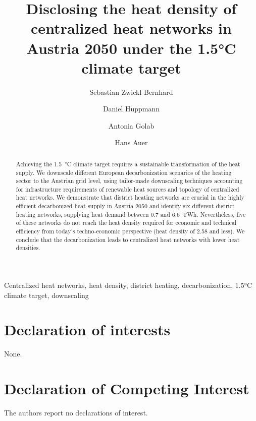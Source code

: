\documentclass[review]{elsarticle}
\begin{document}
\begin{frontmatter}

\title{Disclosing the heat density of centralized heat networks in Austria 2050 under the 1.5°C climate target}
\author[1,2]{Sebastian Zwickl-Bernhard}
\author[2]{Daniel Huppmann}
\author[1]{Antonia Golab}
\author[1]{Hans Auer}
\address[1]{Energy Economics Group (EEG), Technische Universität Wien, Gusshausstrasse 25-29/E370-3, 1040 Wien, Austria}
\address[2]{Energy, Climate and Environment (ECE) Program,  International Institute for Applied Systems Analysis (IIASA), Laxenburg, Austria}

\begin{abstract}
	Achieving the \SI{1.5}{\degreeCelsius} climate target requires a sustainable transformation of the heat supply. We downscale different European decarbonization scenarios of the heating sector to the Austrian grid level, using tailor-made downscaling techniques accounting for infrastructure requirements of renewable heat sources and topology of centralized heat networks. We demonstrate that district heating networks are crucial in the highly efficient decarbonized heat supply in Austria 2050 and identify six different district heating networks, supplying heat demand between \SI{0.7}{} and \SI{6.6}{TWh}. Nevertheless, five of these networks do not reach the heat density required for economic and technical efficiency from today's techno-economic perspective (heat density of \SI{2.58}{} and less). We conclude that the decarbonization leads to centralized heat networks with lower heat densities. 
\end{abstract}

\begin{keyword}
	Centralized heat networks, heat density, district heating, decarbonization, 1.5°C climate target, downscaling
\end{keyword}
\end{frontmatter}

\newpage

\newpage

\newpage

\newpage





\section*{Declaration of interests}
None.
\section*{Declaration of Competing Interest}
The authors report no declarations of interest.
\end{document}
